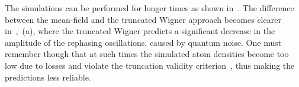 The simulations can be performed for longer times as shown in~.
The difference between the mean-field and the truncated Wigner approach becomes clearer in~,~(a), where the truncated Wigner predicts a significant decrease in the amplitude of the rephasing oscillations, caused by quantum noise.
One must remember though that at such times the simulated atom densities become too low due to losses and violate the truncation validity criterion~, thus making the predictions less reliable.

